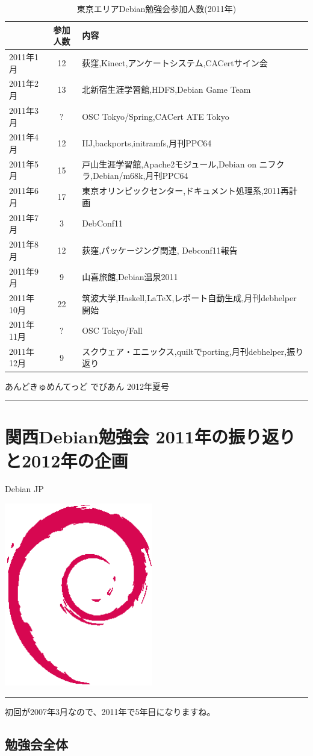 \documentclass[mingoth,a4paper]{jsarticle}
\renewcommand{\dancersection}[2]{%
\newpage
あんどきゅめんてっど でびあん 2012年夏号
%
\vspace{0.1mm}\\
{\color{dancerdarkblue}\rule{\hsize}{2mm}}

%
%
\begin{minipage}[t]{0.6\hsize}
\color{dancerdarkblue}
\vspace{1cm}
\section{#1}
\hfill{}#2\\
\end{minipage}
\begin{minipage}[t]{0.4\hsize}
\vspace{-2cm}
\hfill{}\includegraphics[height=8cm]{image200502/openlogo-nd.eps}\\
\vspace{-5cm}
\end{minipage}
%
{\color{dancerlightblue}\rule{0.66\hsize}{2mm}}
%
\vspace{2cm}
}
\begin{document}
\begin{table}[t]
\begin{minipage}{0.5\hsize}
 \caption{東京エリアDebian勉強会参加人数(2011年)}\label{tab:count2011}
 \begin{center}
  \begin{tabular}{|l|c|p{10em}|}
 \hline
 & 参加人数 & 内容\\
 \hline
   2011年1月 & 12 & 荻窪,Kinect,アンケートシステム,CACertサイン会 \\
   2011年2月 & 13 & 北新宿生涯学習館,HDFS,Debian Game Team \\
   2011年3月 & ? & OSC Tokyo/Spring,CACert ATE Tokyo \\
   2011年4月 & 12 & IIJ,backports,initramfs,月刊PPC64 \\
   2011年5月 & 15 & 戸山生涯学習館,Apache2モジュール,Debian on ニフクラ,Debian/m68k,月刊PPC64 \\
   2011年6月 & 17 & 東京オリンピックセンター,ドキュメント処理系,2011再計画 \\
   2011年7月 & 3 & DebConf11 \\
   2011年8月 & 12 & 荻窪,パッケージング関連, Debconf11報告 \\
   2011年9月 & 9 & 山喜旅館,Debian温泉2011 \\
   2011年10月 & 22 & 筑波大学,Haskell,LaTeX,レポート自動生成,月刊debhelper開始 \\
   2011年11月 & ? & OSC Tokyo/Fall \\
   2011年12月 & 9 & スクウェア・エニックス,quiltでporting,月刊debhelper,振り返り \\
 \hline
  \end{tabular}
 \end{center}
\end{minipage}
\end{table}

\clearpage

\dancersection{関西Debian勉強会 2011年の振り返りと2012年の企画}{Debian JP}

初回が2007年3月なので、2011年で5年目になりますね。

\subsection{勉強会全体}
\end{document}
